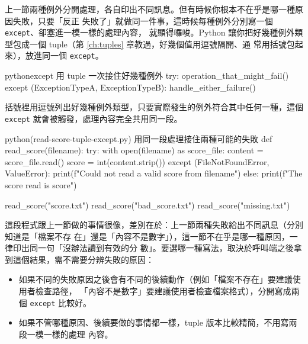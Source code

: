 上一節兩種例外分開處理，各自印出不同訊息。但有時候你根本不在乎是哪一種原因失敗，只要「反正
失敗了」就做同一件事，這時候每種例外分別寫一個 \texttt{except}、卻塞進一模一樣的處理內容，
就顯得囉唆。Python 讓你把好幾種例外類型包成一個 tuple（第 \ref{ch:tuples} 章教過，好幾個值用逗號隔開、通
常用括號包起來），放進同一個 \texttt{except}。

\begin{code}{python}{except 用 tuple 一次接住好幾種例外}
try:
    operation_that_might_fail()
except (ExceptionTypeA, ExceptionTypeB):
    handle_either_failure()
\end{code}

括號裡用逗號列出好幾種例外類型，只要實際發生的例外符合其中任何一種，這個 \texttt{except}
就會被觸發，處理內容完全共用同一段。

\begin{example}{python}{(read-score-tuple-except.py) 用同一段處理接住兩種可能的失敗}
def read_score(filename):
    try:
        with open(filename) as score_file:
            content = score_file.read()
        score = int(content.strip())
    except (FileNotFoundError, ValueError):
        print(f"Could not read a valid score from {filename}")
    else:
        print(f"The score read is {score}")

read_score("score.txt")
read_score("bad_score.txt")
read_score("missing.txt")
\end{example}


這段程式跟上一節做的事情很像，差別在於：上一節兩種失敗給出不同訊息（分別知道是「檔案不存
在」還是「內容不是數字」），這一節不在乎是哪一種原因，一律印出同一句「沒辦法讀到有效的分
數」。要選哪一種寫法，取決於呼叫端之後拿到這個結果，需不需要分辨失敗的原因：

\begin{itemize}
\item 如果不同的失敗原因之後會有不同的後續動作（例如「檔案不存在」要建議使用者檢查路徑，
「內容不是數字」要建議使用者檢查檔案格式），分開寫成兩個 \texttt{except} 比較好。
\item 如果不管哪種原因、後續要做的事情都一樣，tuple 版本比較精簡，不用寫兩段一模一樣的處理
內容。
\end{itemize}

